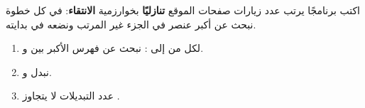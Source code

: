 \begin{statement}
اكتب برنامجًا يرتب عدد زيارات صفحات الموقع \textbf{تنازليًا} بخوارزمية \textbf{الانتقاء}: في كل خطوة نبحث عن أكبر عنصر في الجزء غير المرتب ونضعه في بدايته.
\end{statement}
\begin{stepsbox}\begin{enumerate}
\item لكل  من  إلى : نبحث عن فهرس الأكبر  بين  و.
\item نبدل  و.
\item عدد التبديلات لا يتجاوز .
\end{enumerate}\end{stepsbox}

